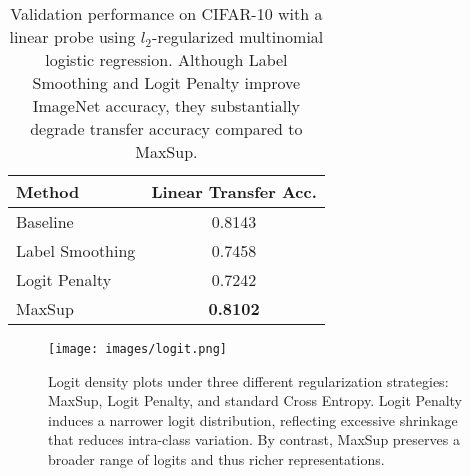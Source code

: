 \begin{table}[t]
\centering
\scriptsize
\caption{Validation performance on CIFAR-10 with a linear probe using $l_2$-regularized multinomial logistic regression. Although Label Smoothing and Logit Penalty improve ImageNet accuracy, they substantially degrade transfer accuracy compared to MaxSup.}
\label{tab:validation_performance}
\begin{tabular}{@{}l|c@{}}
\toprule
\textbf{Method} & \textbf{Linear Transfer Acc.} \\
\midrule
Baseline & 0.8143 \\
\hline
Label Smoothing & 0.7458 \\
Logit Penalty \citep{dauphin2021deconstructing} & 0.7242 \\
MaxSup & \textbf{0.8102} \\
\bottomrule
\end{tabular}
\end{table}



\begin{figure}[t]
    \centering
    \texttt{[image: images/logit.png]}
    \vspace{-2mm}
    \caption{Logit density plots under three different regularization strategies: MaxSup, Logit Penalty, and standard Cross Entropy. Logit Penalty induces a narrower logit distribution, reflecting excessive shrinkage that reduces intra-class variation. By contrast, MaxSup preserves a broader range of logits and thus richer representations.}
    \vspace{-1mm}
    \label{fig:logit-analysis}
\end{figure}

